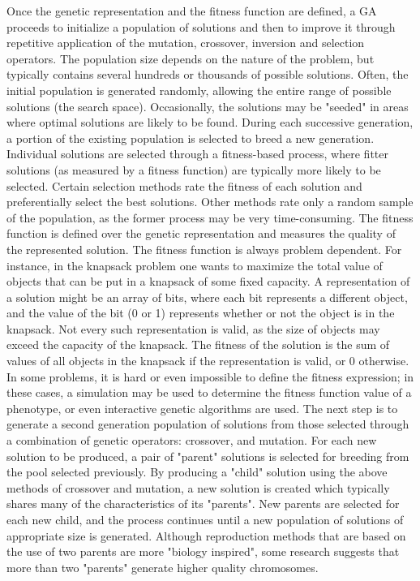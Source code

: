 Once the genetic representation and the fitness function are defined, a GA proceeds to initialize a population of solutions and then to improve it through repetitive application of the mutation, crossover, inversion and selection operators.
The population size depends on the nature of the problem, but typically contains several hundreds or thousands of possible solutions. Often, the initial population is generated randomly, allowing the entire range of possible solutions (the search space). Occasionally, the solutions may be "seeded" in areas where optimal solutions are likely to be found.
During each successive generation, a portion of the existing population is selected to breed a new generation. Individual solutions are selected through a fitness-based process, where fitter solutions (as measured by a fitness function) are typically more likely to be selected. Certain selection methods rate the fitness of each solution and preferentially select the best solutions. Other methods rate only a random sample of the population, as the former process may be very time-consuming.
The fitness function is defined over the genetic representation and measures the quality of the represented solution. The fitness function is always problem dependent. For instance, in the knapsack problem one wants to maximize the total value of objects that can be put in a knapsack of some fixed capacity. A representation of a solution might be an array of bits, where each bit represents a different object, and the value of the bit (0 or 1) represents whether or not the object is in the knapsack. Not every such representation is valid, as the size of objects may exceed the capacity of the knapsack. The fitness of the solution is the sum of values of all objects in the knapsack if the representation is valid, or $0$ otherwise.
In some problems, it is hard or even impossible to define the fitness expression; in these cases, a simulation may be used to determine the fitness function value of a phenotype, or even interactive genetic algorithms are used.
The next step is to generate a second generation population of solutions from those selected through a combination of genetic operators: crossover, and mutation.
For each new solution to be produced, a pair of "parent" solutions is selected for breeding from the pool selected previously. By producing a "child" solution using the above methods of crossover and mutation, a new solution is created which typically shares many of the characteristics of its "parents". New parents are selected for each new child, and the process continues until a new population of solutions of appropriate size is generated. Although reproduction methods that are based on the use of two parents are more "biology inspired", some research suggests that more than two "parents" generate higher quality chromosomes.
